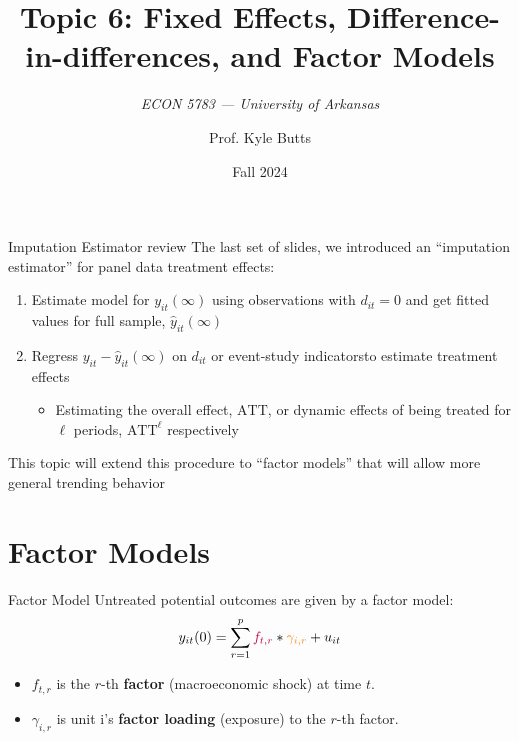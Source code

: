 \documentclass[aspectratio=169,t,11pt,table]{beamer}
\title{Topic 6: Fixed Effects, Difference-in-differences, and Factor Models}
\subtitle{\it  ECON 5783 — University of Arkansas}
\date{Fall 2024}
\author{Prof. Kyle Butts}
\begin{document}
\begin{frame}
\maketitle

\end{frame}

\begin{frame}{Imputation Estimator review}
  The last set of slides, we introduced an ``imputation estimator'' for panel data treatment effects:

  \begin{enumerate}
    \item Estimate model for $y_{it}(\infty)$ using observations with $d_{it} = 0$ and get fitted values for full sample, $\hat{y}_{it}(\infty)$
    
    \item Regress $y_{it} - \hat{y}_{it}(\infty)$ on $d_{it}$ or event-study indicatorsto estimate treatment effects
    \begin{itemize}
      \item Estimating the overall effect, $\text{ATT}$, or dynamic effects of being treated for $\ell$ periods, $\text{ATT}^\ell$ respectively
    \end{itemize}
  \end{enumerate}
  
  \pause
  \bigskip
  This topic will extend this procedure to ``factor models'' that will allow more general trending behavior
\end{frame}

\section{Factor Models}

\begin{frame}{Factor Model}
  Untreated potential outcomes are given by a factor model:
  $$
    y_{it}(0) = \sum_{r = 1}^{p} {\color{purple}f_{t,r}} * {\color{orange}\gamma_{i,r}} + u_{it}
  $$

  \begin{itemize}
    \item $f_{t, r}$ is the $r$-th \textbf{\color{purple} factor} (macroeconomic shock) at time $t$.
    \item $\gamma_{i,r}$ is unit i's \textbf{\color{orange} factor loading} (exposure) to the $r$-th factor.
  \end{itemize}
\end{frame}
\end{document}

